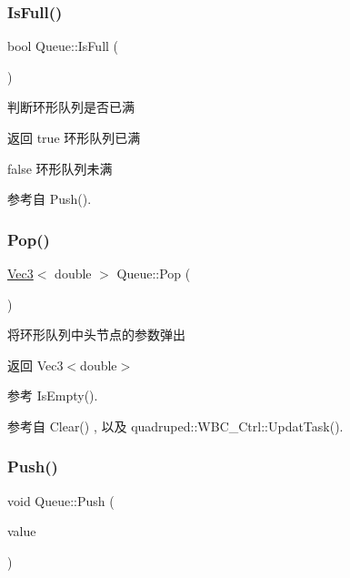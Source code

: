 \subsubsection{\texorpdfstring{Is\+Full()}{IsFull()}}
{\footnotesize\ttfamily bool Queue\+::\+Is\+Full (\begin{DoxyParamCaption}\item[{void}]{ }\end{DoxyParamCaption})}



判断环形队列是否已满 

\begin{DoxyReturn}{返回}
true 环形队列已满 

false 环形队列未满 
\end{DoxyReturn}


参考自 Push().

\mbox{\label{classquadruped_1_1Queue_a6021646c0fbb5d7f1273a12c91bf5974}} 
\subsubsection{\texorpdfstring{Pop()}{Pop()}}
{\footnotesize\ttfamily \hyperlink{cppTypes_8h_a65c27bf97693676535dd0b30ea0ad399}{Vec3}$<$ double $>$ Queue\+::\+Pop (\begin{DoxyParamCaption}\item[{void}]{ }\end{DoxyParamCaption})}



将环形队列中头节点的参数弹出 

\begin{DoxyReturn}{返回}
Vec3$<$double$>$ 
\end{DoxyReturn}


参考 Is\+Empty().



参考自 Clear() , 以及 quadruped\+::\+W\+B\+C\+\_\+\+Ctrl\+::\+Updat\+Task().

\mbox{\label{classquadruped_1_1Queue_ac57215a33ba972830ed82cae76d37a19}} 
\subsubsection{\texorpdfstring{Push()}{Push()}}
{\footnotesize\ttfamily void Queue\+::\+Push (\begin{DoxyParamCaption}\item[{\hyperlink{cppTypes_8h_a65c27bf97693676535dd0b30ea0ad399}{Vec3}$<$ double $>$}]{value }\end{DoxyParamCaption})}



